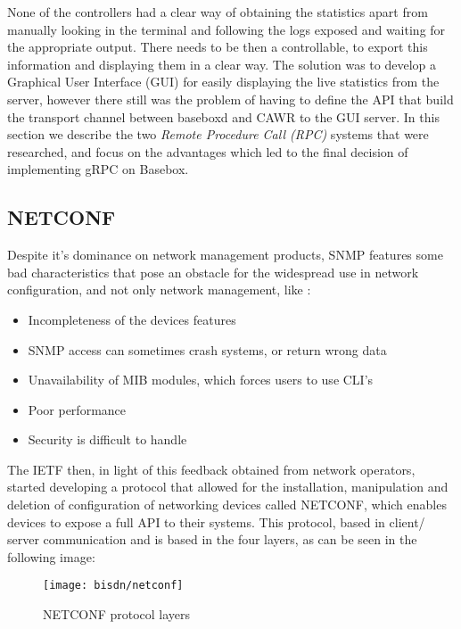 None of the controllers had a clear way of obtaining the statistics apart from manually looking in the terminal and following the logs exposed and waiting for the appropriate output. There needs to be then a controllable, to export
this information and displaying them in a clear way. The solution was to develop a Graphical User Interface (GUI) for easily displaying the live statistics from the server, however there still was the problem of having to 
define the API that build the transport channel between baseboxd and CAWR to the GUI server. In this section we describe the two \textit {Remote Procedure Call (RPC)} systems that were researched, and focus on the advantages which
led to the final decision of implementing gRPC on Basebox.

\subsection {NETCONF} \label {sec:netconf}

Despite it's dominance on network management products, SNMP features some bad characteristics that pose an obstacle for the widespread use in network configuration, and not only network management, like 
\cite {CITE - https://tools.ietf.org/html/rfc3535}: 

\begin {itemize}
    \item Incompleteness of the devices features
    \item SNMP access can sometimes crash systems, or return wrong data
    \item Unavailability of MIB modules, which forces users to use CLI's
    \item Poor performance 
    \item Security is difficult to handle
\end {itemize}

\par The IETF then, in light of this feedback obtained from network operators, started developing a protocol that allowed for the installation, manipulation and deletion of configuration of networking devices called NETCONF, which 
enables devices to expose a full API to their systems. This protocol, based in client/ server communication and is based in the four layers, as can be seen in the following image:

\begin{figure} [!htbp]
    \centering
    \texttt{[image: bisdn/netconf]}
    \caption{NETCONF protocol layers \cite {CITE - Basebox architecture}}
\end{figure}


